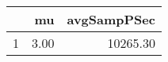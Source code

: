 \begin{table}[h]
\centering
\begin{tabular}{rrr}
  \hline
 & mu & avgSampPSec \\ 
  \hline
1 & 3.00 & 10265.30 \\ 
   \hline
\end{tabular}
\end{table}
